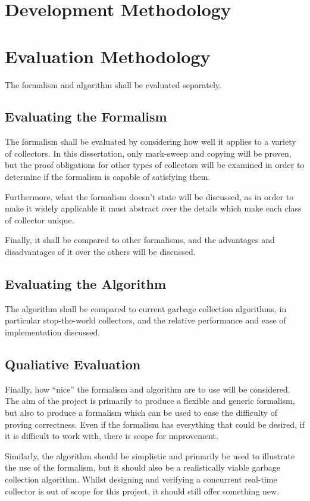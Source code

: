 \section{Development Methodology}
\label{sec:analysis-development}


\section{Evaluation Methodology}
\label{sec:analysis-evaluation}

The formalism and algorithm shall be evaluated separately.

\subsection{Evaluating the Formalism}
\label{sec:analysis-evaluation-formalism}

The formalism shall be evaluated by considering how well it applies to
a variety of collectors. In this dissertation, only mark-sweep and
copying will be proven, but the proof obligations for other types of
collectors will be examined in order to determine if the formalism is
capable of satisfying them.

Furthermore, what the formalism doesn't state will be discussed, as in
order to make it widely applicable it must abstract over the details
which make each class of collector unique.

Finally, it shall be compared to other formalisms, and the advantages
and disadvantages of it over the others will be discussed.

\subsection{Evaluating the Algorithm}
\label{sec:analysis-evaluation-algorithm}

The algorithm shall be compared to current garbage collection
algorithms, in particular stop-the-world collectors, and the relative
performance and ease of implementation discussed.

\subsection{Qualiative Evaluation}
\label{sec:analysis-evaluation-qualitative}

Finally, how ``nice'' the formalism and algorithm are to use will be
considered. The aim of the project is primarily to produce a flexible
and generic formalism, but also to produce a formalism which can be
used to ease the difficulty of proving correctness. Even if the
formalism has everything that could be desired, if it is difficult to
work with, there is scope for improvement.

Similarly, the algorithm should be simplistic and primarily be used to
illustrate the use of the formalism, but it should also be a
realistically viable garbage collection algorithm. Whilst designing
and verifying a concurrent real-time collector is out of scope for
this project, it should still offer something new.
